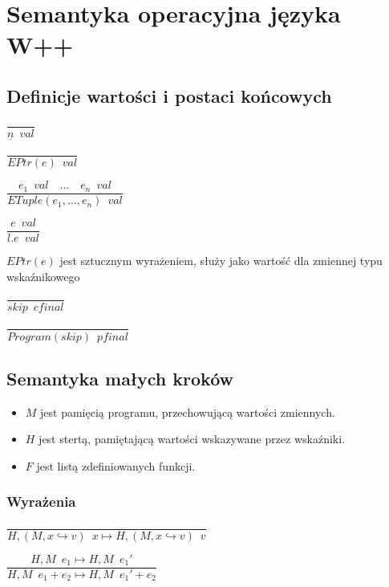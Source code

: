 \documentclass{article}
\begin{document}
\section{Semantyka operacyjna języka W++}

\subsection{Definicje wartości i postaci końcowych}
\centerline{$\dfrac{}{\underline{n} \enspace val}$}\vspace{5pt}
\centerline{$\dfrac{}{EPtr(e) \enspace val}$}\vspace{5pt}
\centerline{$\dfrac{e_1 \enspace val \quad ... \quad e_n \enspace val}{ETuple(e_1, ..., e_n) \enspace val}$}\vspace{5pt}
\centerline{$\dfrac{e \enspace val}{l.e \enspace val}$}\vspace{5pt}

$EPtr(e)$ jest sztucznym wyrażeniem, służy jako wartość dla zmiennej typu wskaźnikowego

\centerline{$\dfrac{}{skip \enspace cfinal}$}\vspace{5pt}

\centerline{$\dfrac{}{Program(skip) \enspace pfinal}$}\vspace{5pt}

\subsection{Semantyka małych kroków}

\begin{itemize}
    \item $M$ jest pamięcią programu, przechowującą wartości zmiennych.
    \item $H$ jest stertą, pamiętającą wartości wskazywane przez wskaźniki.
    \item $F$ jest listą zdefiniowanych funkcji.
\end{itemize}

\subsubsection{Wyrażenia}

\centerline{$\dfrac{}{H, (M, x \hookrightarrow v) \enspace x \longmapsto H, (M, x \hookrightarrow v) \enspace v}$}\vspace{5pt}

\centerline{$\dfrac{H, M \enspace e_1 \longmapsto H, M \enspace e_1'}{H, M \enspace e_1 + e_2 \longmapsto H, M \enspace e_1' + e_2}$}\vspace{5pt}
\end{document}
